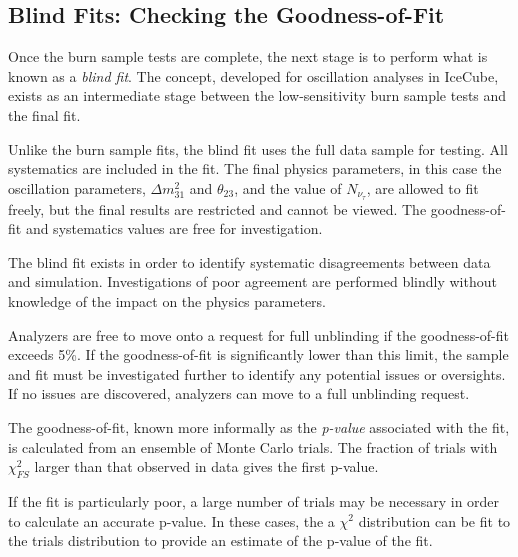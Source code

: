 \label{subsec:blind_fits}
\subsection{Blind Fits: Checking the Goodness-of-Fit}
Once the burn sample tests are complete, the next stage is to perform what is known as a \emph{blind fit}.
The concept, developed for oscillation analyses in IceCube, exists as an intermediate stage between the low-sensitivity burn sample tests and the final fit.

Unlike the burn sample fits, the blind fit uses the full data sample for testing.
All systematics are included in the fit.
The final physics parameters, in this case the oscillation parameters, $\Delta m^2_{31}$ and $\theta_{23}$,  and the value of $N_{\nu_\tau}$, are allowed to fit freely, but the final results are restricted and cannot be viewed.
The goodness-of-fit and systematics values are free for investigation.

The blind fit exists in order to identify systematic disagreements between data and simulation.
Investigations of poor agreement are performed blindly without knowledge of the impact on the physics parameters.

Analyzers are free to move onto a request for full unblinding if the goodness-of-fit exceeds 5\%.
If the goodness-of-fit is significantly lower than this limit, the sample and fit must be investigated further to identify any potential issues or oversights.
If no issues are discovered, analyzers can move to a full unblinding request.

The goodness-of-fit, known more informally as the \emph{p-value} associated with the fit, is calculated from an ensemble of Monte Carlo trials.
The fraction of trials with $\chi_{FS}^2$ larger than that observed in data gives the first p-value.

If the fit is particularly poor, a large number of trials may be necessary in order to calculate an accurate p-value.
In these cases, the a $\chi^2$ distribution can be fit to the trials distribution to provide an estimate of the p-value of the fit.



